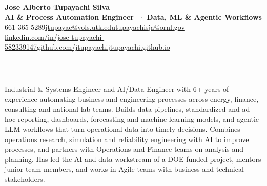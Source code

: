 \documentclass[10pt,a4paper]{extarticle}
\newcommand{\sep}{\hspace{0.45em}\textcolor{bul}{\textbar}\hspace{0.45em}}
\newcommand{\link}[2]{\href{#1}{#2}}
\newcommand{\sect}[2][]{\needspace{45pt}\vspace{9pt}%
  {\color{navy}\bfseries\large\textls[60]{\MakeUppercase{#2}}}{\color{muted}\small\ #1}\\[-6.5pt]
  {\color{navy}\rule{\linewidth}{0.5pt}}\par\vspace{-1pt}}
\begin{document}
\small

\begin{center}
  {\color{navy}\fontsize{22}{26}\selectfont\bfseries Jose Alberto Tupayachi Silva}\\[3pt]
  {\normalsize\bfseries AI \& Process Automation Engineer \ $\cdot$\ Data, ML \& Agentic Workflows}\\[3pt]
  {\color{muted}\footnotesize
  661-365-5289\sep\link{mailto:jtupayac@vols.utk.edu}{jtupayac@vols.utk.edu}\sep\link{mailto:tupayachisja@ornl.gov}{tupayachisja@ornl.gov}\\[1pt]
  \link{https://www.linkedin.com/in/jose-tupayachi-582339147}{linkedin.com/in/jose-tupayachi-582339147}\sep\link{https://github.com/jtupayachi}{github.com/jtupayachi}\sep\link{https://jtupayachi.github.io/}{jtupayachi.github.io}}
\end{center}

\sect{Summary}

Industrial \& Systems Engineer and AI/Data Engineer with 6+ years of experience automating business and engineering processes across energy, finance, consulting and national-lab teams. Builds data pipelines, standardized and ad hoc reporting, dashboards, forecasting and machine learning models, and agentic LLM workflows that turn operational data into timely decisions. Combines operations research, simulation and reliability engineering with AI to improve processes, and partners with Operations and Finance teams on analysis and planning. Has led the AI and data workstream of a DOE-funded project, mentors junior team members, and works in Agile teams with business and technical stakeholders.
\end{document}
